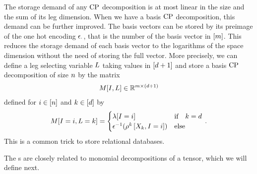 \begin{remark}
    \label{rem:matStorageBas}
    The storage demand of any $\mathrm{CP}$ decomposition is at most linear in the size and the sum of its leg dimension.
    When we have a basis $\mathrm{CP}$ decomposition, this demand can be further improved.
    The basis vectors can be stored by its preimage of the one hot encoding $\epsilon_{\cdot}$, that is the number of the basis vector in $[m]$.
    This reduces the storage demand of each basis vector to the logarithms of the space dimension without the need of storing the full vector.
    More precisely, we can define a leg selecting variable $L$ taking values in $[d+1]$ and store a basis $\mathrm{CP}$ decomposition of size $n$ by the matrix
    \begin{align*}
        M[I,L] \in \mathbb{R}^{m \times (d+1)}
    \end{align*}
    defined for $i\in[n]$ and $k\in[d]$ by
    \begin{align*}
        \matrixat{\inddecvar,\selvariable=\atomenumerator} =
        \begin{cases}
            \scalarcoreat{\inddecvar} & \ifspace \atomenumerator = \catorder \\
            \invonehotmapof{\legcoreofat{\atomenumerator}{\catvariableof{\atomenumerator},\indexeddecvariable}} & \text{else} \\%
        \end{cases} \, .
    \end{align*}
    This is a common trick to store relational databases.
\end{remark}



The \basplusDecomposition{}s are closely related to monomial decompositions of a tensor, which we will define next.

